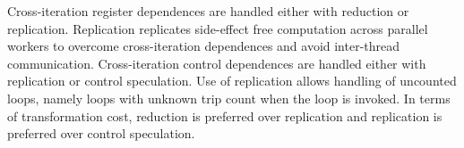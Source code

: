 Cross-iteration register dependences
are handled either with reduction or replication. Replication
replicates side-effect free computation across parallel workers to
overcome cross-iteration dependences and avoid inter-thread
communication.
%
Cross-iteration control dependences are handled either with
replication or control speculation.
Use of replication allows handling of uncounted loops, namely loops
with unknown trip count when the loop is invoked.
%
In terms of transformation cost, reduction is preferred over
replication and replication is preferred over control speculation.


%

%
%
%
%
%
%
%
